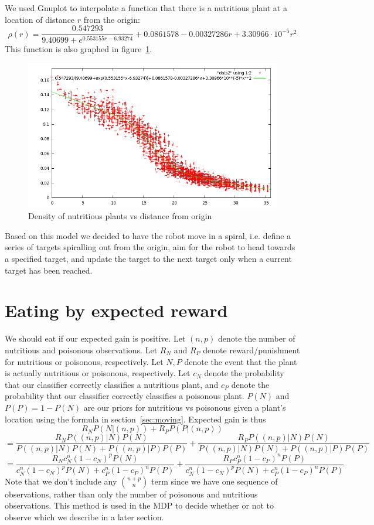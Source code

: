 \documentclass{article}
\begin{document}
We used Gnuplot to interpolate a function that there is a nutritious
plant at a location of distance $r$ from the origin:
$$\rho(r)=\frac{0.547293}{9.40699+e^{0.553155r-6.93274}}+0.0861578-0.00327286r+3.30966\cdot10^{-5}r^2$$
This function is also graphed in figure~\ref{fig:plant_freq}.
\begin{centering}
\begin{figure}[here]
\includegraphics[scale=0.55]{nutritiousmodel.png}
\caption{Density of nutritious plants vs distance from origin}
\label{fig:plant_freq}
\end{figure}
\end{centering}

Based on this model we decided to have the robot move in a spiral,
i.e. define a series of targets spiralling out from the origin,
aim for the robot to head towards a specified target, and update 
the target to the next target only when a current target has been
reached. 

\section{Eating by expected reward}
\label{sec:eating}
We should eat if our expected gain is positive. 
Let $(n,p)$ denote the number of nutritious and poisonous observations.
Let $R_N$ and $R_P$ denote reward/punishment for nutritious or poisonous,
respectively. Let $N,P$ denote the event that the plant is actually
nutritious or poisonous, respectively. 
Let $c_N$ denote the probability that our classifier correctly classifies
a nutritious plant, and $c_P$ denote the probability that our classifier
correctly classifies a poisonous plant. $P(N)$ and $P(P)=1-P(N)$ are our priors
for nutritious vs poisonous given a plant's location using the formula
in section~\ref{sec:moving}. 
Expected gain is thus
$$R_N P(N|(n,p)) +R_P  P(P|(n,p))$$ 
$$= \frac{R_NP((n,p)|N) P(N)}{P((n,p)|N)P(N)+P((n,p)|P)P(P)} + \frac{R_PP((n,p)|N)P(N)}{P((n,p)|N)P(N)+P((n,p)|P)P(P)}$$
$$= \frac{R_Nc_N^n(1-c_N)^p P(N)}{ c_N^n(1-c_N)^p P(N) +  c_P^n(1-c_P)^n P(P)} + \frac{R_P c_P^n(1-c_P)^n P(P) }{ c_N^n(1-c_N)^p P(N)+c_P^n(1-c_P)^n P(P)}$$
Note that we don't include any ${n+p\choose n}$ term since we have one
sequence of observations, rather than only the number of poisonous and nutritious
observations. 
This method is used in the MDP to decide whether or not to observe
which we describe in a later section. 
\end{document}
